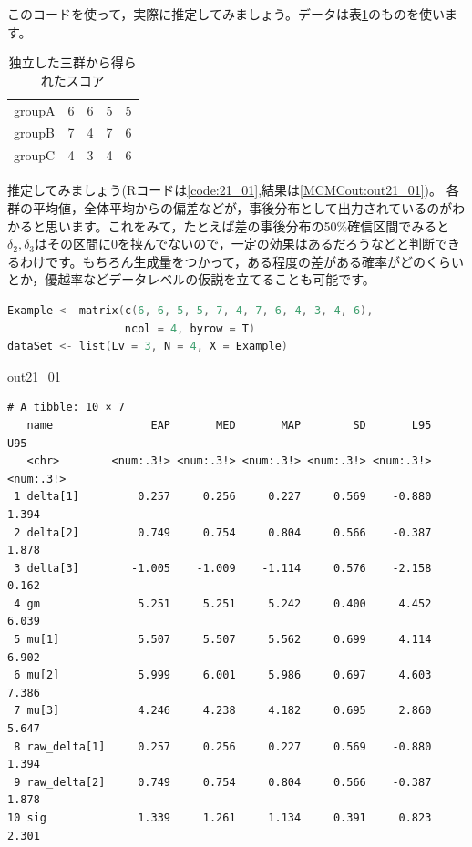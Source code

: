 \documentclass{ltjsbook}
\begin{document}
このコードを使って，実際に推定してみましょう。データは表\ref{tbl::21_01}のものを使います。
\begin{table}[ht]
  \begin{center}
    \caption{独立した三群から得られたスコア}
    \begin{tabular}{l|llll}\hline
      groupA & 6 & 6 & 5 & 5 \\
      groupB & 7 & 4 & 7 & 6 \\
      groupC & 4 & 3 & 4 & 6 \\\hline
    \end{tabular}
    \label{tbl::21_01}
  \end{center}
\end{table}

推定してみましょう(Rコードは\ref{code:21_01},結果は\ref{MCMCout:out21_01})。
各群の平均値，全体平均からの偏差などが，事後分布として出力されているのがわかると思います。これをみて，たとえば差の事後分布の50\%確信区間でみると$\delta_2,\delta_3$はその区間に0を挟んでないので，一定の効果はあるだろうなどと判断できるわけです。もちろん生成量をつかって，ある程度の差がある確率がどのくらいとか，優越率などデータレベルの仮説を立てることも可能です。

\begin{lstlisting}[language=c++,label={code:21_01},caption={三群の平均値の比較}]
Example <- matrix(c(6, 6, 5, 5, 7, 4, 7, 6, 4, 3, 4, 6), 
                  ncol = 4, byrow = T)
dataSet <- list(Lv = 3, N = 4, X = Example)
\end{lstlisting}

\begin{MCMCout}{}{out21_01}
\begin{verbatim}
# A tibble: 10 × 7
   name               EAP       MED       MAP        SD       L95       U95
   <chr>        <num:.3!> <num:.3!> <num:.3!> <num:.3!> <num:.3!> <num:.3!>
 1 delta[1]         0.257     0.256     0.227     0.569    -0.880     1.394
 2 delta[2]         0.749     0.754     0.804     0.566    -0.387     1.878
 3 delta[3]        -1.005    -1.009    -1.114     0.576    -2.158     0.162
 4 gm               5.251     5.251     5.242     0.400     4.452     6.039
 5 mu[1]            5.507     5.507     5.562     0.699     4.114     6.902
 6 mu[2]            5.999     6.001     5.986     0.697     4.603     7.386
 7 mu[3]            4.246     4.238     4.182     0.695     2.860     5.647
 8 raw_delta[1]     0.257     0.256     0.227     0.569    -0.880     1.394
 9 raw_delta[2]     0.749     0.754     0.804     0.566    -0.387     1.878
10 sig              1.339     1.261     1.134     0.391     0.823     2.301
\end{verbatim}
\end{MCMCout}
\end{document}
